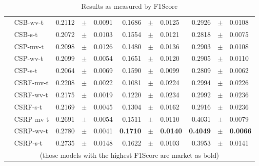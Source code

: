 {\begin{table}[!t]
\begin{tabular}{l l r@{\hskip 0in}c@{\hskip 0in}l r@{\hskip 0in}c@{\hskip 0in}l r@{\hskip 
0in}c@{\hskip 0in}l}
&CSB-wv-t & 0.2112 &$\pm$& 0.0091 & 0.1686 &$\pm$& 0.0125 & 0.2926 &$\pm$& 0.0108 \\
&CSB-s-t & 0.2072 &$\pm$& 0.0103 & 0.1554 &$\pm$& 0.0121 & 0.2818 &$\pm$& 0.0075 \\
&CSP-mv-t & 0.2098 &$\pm$& 0.0126 & 0.1480 &$\pm$& 0.0136 & 0.2903 &$\pm$& 0.0108 \\
&CSP-wv-t & 0.2099 &$\pm$& 0.0054 & 0.1651 &$\pm$& 0.0120 & 0.2905 &$\pm$& 0.0110 \\
&CSP-s-t & 0.2064 &$\pm$& 0.0069 & 0.1590 &$\pm$& 0.0099 & 0.2809 &$\pm$& 0.0062 \\
&CSRF-mv-t & 0.2208 &$\pm$& 0.0022 & 0.1081 &$\pm$& 0.0224 & 0.2994 &$\pm$& 0.0226 \\
&CSRF-wv-t & 0.2175 &$\pm$& 0.0019 & 0.1220 &$\pm$& 0.0234 & 0.2992 &$\pm$& 0.0236 \\
&CSRF-s-t & 0.2169 &$\pm$& 0.0045 & 0.1304 &$\pm$& 0.0162 & 0.2916 &$\pm$& 0.0236 \\
&CSRP-mv-t & 0.2691 &$\pm$& 0.0054 & 0.1511 &$\pm$& 0.0110 & 0.4031 &$\pm$& 0.0079 \\
&CSRP-wv-t & 0.2780 &$\pm$& 0.0041 & \bf{0.1710} &\bf{$\pm$}& \bf{0.0140} & \bf{0.4049} 
&\bf{$\pm$}& \bf{0.0066}\\
&CSRP-s-t & 0.2735 &$\pm$& 0.0148 & 0.1622 &$\pm$& 0.0103 & 0.3953 &$\pm$& 0.0141 \\
      \hline
      \multicolumn{11}{c}{(those models with the highest F1Score are market as bold)}
    \end{tabular}
\caption{Results as measured by F1Score}
\label{tab:9:results_f1score}
  \end{table}

}
